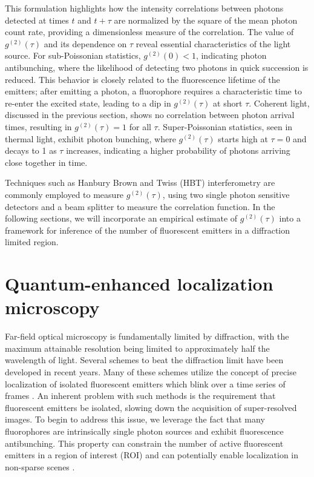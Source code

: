 This formulation highlights how the intensity correlations between photons detected at times $ t $ and $ t+\tau $ are normalized by the square of the mean photon count rate, providing a dimensionless measure of the correlation. The value of $ g^{(2)}(\tau) $ and its dependence on $ \tau $ reveal essential characteristics of the light source. For sub-Poissonian statistics, $ g^{(2)}(0) < 1$, indicating photon antibunching, where the likelihood of detecting two photons in quick succession is reduced. This behavior is closely related to the fluorescence lifetime of the emitters; after emitting a photon, a fluorophore requires a characteristic time to re-enter the excited state, leading to a dip in $ g^{(2)}(\tau) $ at short $ \tau $. Coherent light, discussed in the previous section, shows no correlation between photon arrival times, resulting in $ g^{(2)}(\tau) = 1 $ for all $ \tau $. Super-Poissonian statistics, seen in thermal light, exhibit photon bunching, where $ g^{(2)}(\tau) $ starts high at $ \tau = 0 $ and decays to 1 as $ \tau $ increases, indicating a higher probability of photons arriving close together in time.

Techniques such as Hanbury Brown and Twiss (HBT) interferometry are commonly employed to measure $ g^{(2)}(\tau) $, using two single photon sensitive detectors and a beam splitter to measure the correlation function. In the following sections, we will incorporate an empirical estimate of $g^{(2)}(\tau)$ into a framework for inference of the number of fluorescent emitters in a diffraction limited region. 

\section{Quantum-enhanced localization microscopy}

Far-field optical microscopy is fundamentally limited by diffraction, with the maximum attainable resolution being limited to approximately half the wavelength of light. Several schemes to beat the diffraction limit have been developed in recent years. Many of these schemes utilize the concept of precise localization of isolated fluorescent emitters which blink over a time series of frames \parencite{Rust2006,Betzig2006}. An inherent problem with such methods is the requirement that fluorescent emitters be isolated, slowing down the acquisition of super-resolved images. To begin to address this issue, we leverage the fact that many fluorophores are intrinsically single photon sources and exhibit fluorescence antibunching. This property can constrain the number of active fluorescent emitters in a region of interest (ROI) and can potentially enable localization in non-sparse scenes \parencite{Ta2010,Israel2017}. 

